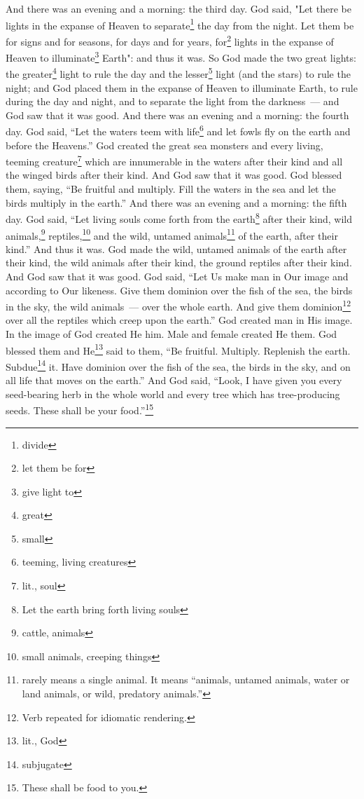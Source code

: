 \begin{enumerate}
     And there was an evening and a morning: the third day.%
     God said, "Let there be lights in the expanse of Heaven to separate\footnote{divide} the day from the night. Let them be for signs and for seasons, for days and for years,%
     for\footnote{let them be for} lights in the expanse of Heaven to illuminate\footnote{give light to} Earth": and thus it was.%
     So God made the two great lights: the greater\footnote{great} light to rule the day and the lesser\footnote{small} light (and the stars) to rule the night;%
     and God placed them in the expanse of Heaven to illuminate Earth,%
     to rule during the day and night, and to separate the light from the darkness~--- and God saw that it was good.%
     And there was an evening and a morning: the fourth day.%
     God said, ``Let the waters teem with life\footnote{teeming, living creatures} and let fowls fly on the earth and before the Heavens.''%
     God created the great sea monsters and every living, teeming creature\footnote{lit., soul} which are innumerable in the waters after their kind and all the winged birds after their kind. And God saw that it was good.%
     God blessed them, saying, ``Be fruitful and multiply. Fill the waters in the sea and let the birds multiply in the earth.''%
     And there was an evening and a morning: the fifth day.%
     God said, ``Let living souls come forth from the earth\footnote{Let the earth bring forth living souls} after their kind, wild animals,\footnote{cattle, animals} reptiles,\footnote{small animals, creeping things} and the wild, untamed animals\footnote{ rarely means a single animal. It means ``animals, untamed animals, water or land animals, or wild, predatory animals.''} of the earth, after their kind.'' And thus it was.%
     God made the wild, untamed animals of the earth after their kind, the wild animals after their kind, the ground reptiles after their kind. And God saw that it was good.%
     God said, ``Let Us make man in Our image and according to Our likeness. Give them dominion over the fish of the sea, the birds in the sky, the wild animals~--- over the whole earth. And give them dominion\footnote{Verb repeated for idiomatic rendering.} over all the reptiles which creep upon the earth.''%
     God created man in His image. In the image of God created He him. Male and female created He them.%
     God blessed them and He\footnote{lit., God} said to them, ``Be fruitful. Multiply. Replenish the earth. Subdue\footnote{subjugate} it. Have dominion over the fish of the sea, the birds in the sky, and on all life that moves on the earth.''%
     And God said, ``Look, I have given you every seed-bearing herb in the whole world and every tree which has tree-producing seeds. These shall be your food.''\footnote{These shall be food to you.}%
\end{enumerate}
